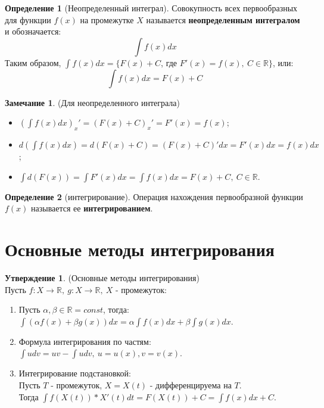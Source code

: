\documentclass{report}
\theoremstyle{definition}
\newtheorem*{definition}{Определение}
\newtheorem*{statement}{Утверждение}
\newtheorem*{remark}{Замечание}
\begin{document}
\begin{definition}[Неопределенный интеграл]
    Совокупность всех первообразных для функции \(f(x)\) на промежутке \(X\) называется
    \textbf{неопределенным интегралом} и обозначается:
    \begin{equation*}
        \int f(x) dx
    \end{equation*}
    Таким образом, \(\int f(x) dx = \{F(x) + C\), где \(F'(x) = f(x), \ C \in \mathbb{R}\}\),
    или:
    \begin{equation*}
        \int f(x) dx = F(x) + C
    \end{equation*}
\end{definition}

\begin{remark}
    (Для неопределенного интеграла)
    \begin{itemize}
        \item \((\int f(x) dx)_{x}' = (F(x) + C)_{x}' = F'(x) = f(x)\);
        \item \(d(\int f(x) dx) = d(F(x) + C) = (F(x) + C)' dx = F'(x) dx = f(x) dx\);
        \item \(\int d(F(x)) = \int F'(x) dx = \int f(x) dx = F(x) + C, \ C \in \mathbb{R}\).
    \end{itemize}
\end{remark}

\begin{definition}[интегрирование]
    Операция нахождения первообразной функции \(f(x)\) называется ее \textbf{интегрированием}.
\end{definition}

\section{Основные методы интегрирования}

\begin{statement}
    (Основные методы интегрирования) \\
    Пусть \(f: X \rightarrow \mathbb{R}, \ g:X \rightarrow \mathbb{R}, \ X\) - промежуток:
    \begin{enumerate}
        \item Пусть \(\alpha, \beta \in \mathbb{R} = const\), тогда:\\
              \(\int (\alpha f(x) + \beta g(x)) dx = \alpha \int f(x) dx + \beta \int g(x) dx\).
        \item Формула интегрирования по частям: \\
              \(\int udv = uv - \int udv, \ u = u(x), v = v(x)\).
        \item Интегрирование подстановкой: \\
              Пусть \(T\) - промежуток, \(X = X(t)\) - дифференцируема на \(T\). \\
              Тогда \(\int f(X(t)) * X'(t) dt = F(X(t)) + C = \int f(x) dx + C\).
    \end{enumerate}
\end{statement}
\end{document}
